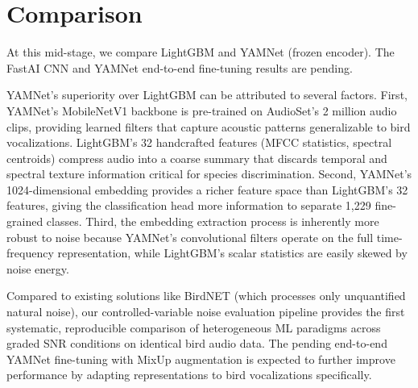 \documentclass[conference]{IEEEtran}
\begin{document}
\section{Comparison}
At this mid-stage, we compare LightGBM and YAMNet (frozen encoder). The FastAI CNN and YAMNet end-to-end fine-tuning results are pending.

YAMNet's superiority over LightGBM can be attributed to several factors. First, YAMNet's MobileNetV1 backbone is pre-trained on AudioSet's 2 million audio clips, providing learned filters that capture acoustic patterns generalizable to bird vocalizations. LightGBM's 32 handcrafted features (MFCC statistics, spectral centroids) compress audio into a coarse summary that discards temporal and spectral texture information critical for species discrimination. Second, YAMNet's 1024-dimensional embedding provides a richer feature space than LightGBM's 32 features, giving the classification head more information to separate 1,229 fine-grained classes. Third, the embedding extraction process is inherently more robust to noise because YAMNet's convolutional filters operate on the full time-frequency representation, while LightGBM's scalar statistics are easily skewed by noise energy.

Compared to existing solutions like BirdNET (which processes only unquantified natural noise), our controlled-variable noise evaluation pipeline provides the first systematic, reproducible comparison of heterogeneous ML paradigms across graded SNR conditions on identical bird audio data. The pending end-to-end YAMNet fine-tuning with MixUp augmentation is expected to further improve performance by adapting representations to bird vocalizations specifically.
\end{document}
